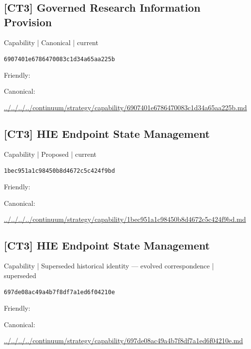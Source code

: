 \documentclass[10pt,a4paper]{article}
\begin{document}
\subsection*{[CT3] Governed Research Information Provision}
{\small Capability | Canonical | current}\par
\texttt{6907401e6786470083c1d34a65aa225b}\par
Friendly: \par
Canonical: \par
{\footnotesize\url{../../../../continuum/strategy/capability/6907401e6786470083c1d34a65aa225b.md}}\par
\subsection*{[CT3] HIE Endpoint State Management}
{\small Capability | Proposed | current}\par
\texttt{1bec951a1c98450b8d4672c5c424f9bd}\par
Friendly: \par
Canonical: \par
{\footnotesize\url{../../../../continuum/strategy/capability/1bec951a1c98450b8d4672c5c424f9bd.md}}\par
\subsection*{[CT3] HIE Endpoint State Management}
{\small Capability | Superseded historical identity — evolved correspondence | superseded}\par
\texttt{697de08ac49a4b7f8df7a1ed6f04210e}\par
Friendly: \par
Canonical: \par
{\footnotesize\url{../../../../continuum/strategy/capability/697de08ac49a4b7f8df7a1ed6f04210e.md}}\par
\end{document}
